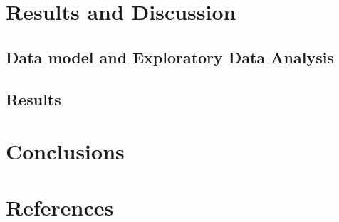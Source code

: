 \documentclass[12pt]{article}
\begin{document}
\newpage\section{Results and Discussion}

\subsection{Data model and Exploratory Data Analysis}

\subsection{Results}

\newpage\section{Conclusions}

\newpage\section{References}
\end{document}

